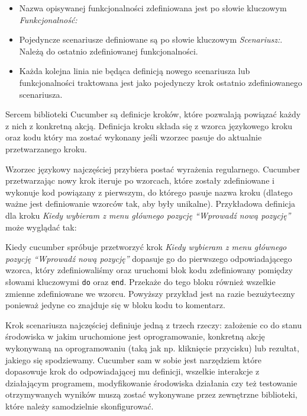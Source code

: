         \begin{itemize}
          \item Nazwa opisywanej funkcjonalności zdefiniowana jest po słowie kluczowym \emph{Funkcjonalność:}
          \item Pojedyncze scenariusze definiowane są po słowie kluczowym \emph{Scenariusz:}. Należą do ostatnio zdefiniowanej funkcjonalności.
          \item Każda kolejna linia nie będąca definicją nowego scenariusza lub funkcjonalności traktowana jest jako pojedynczy krok ostatnio zdefiniowanego scenariusza.
        \end{itemize}
        
      Sercem biblioteki Cucumber są definicje kroków, które pozwalają powiązać każdy z nich z konkretną akcją. Definicja kroku składa się z wzorca językowego kroku oraz kodu który ma zostać wykonany jeśli wzorzec pasuje do aktualnie przetwarzanego kroku.
      
      Wzorzec językowy najczęściej przybiera postać wyrażenia regularnego. Cucumber przetwarzając nowy krok iteruje po wzorcach, które zostały zdefiniowane i wykonuje kod powiązany z pierwszym, do którego pasuje nazwa kroku (dlatego ważne jest definiowanie wzorców tak, aby były unikalne). Przykładowa definicja dla kroku \emph{Kiedy wybieram z menu głównego pozycję \textquotedblleft Wprowadź nową pozycję\textquotedblright} może wyglądać tak:
      
      
      
      Kiedy cucumber spróbuje przetworzyć krok \emph{Kiedy wybieram z menu głównego pozycję \textquotedblleft Wprowadź nową pozycję\textquotedblright} dopasuje go do pierwszego odpowiadającego wzorca, który zdefiniowaliśmy oraz uruchomi blok kodu zdefiniowany pomiędzy słowami kluczowymi \verb+do+ oraz \verb+end+. Przekaże do tego bloku również wszelkie zmienne zdefiniowane we wzorcu. Powyższy przykład jest na razie bezużyteczny ponieważ jedyne co znajduje się w bloku kodu to komentarz.
      
      Krok scenariusza najczęściej definiuje jedną z trzech rzeczy: założenie co do stanu środowiska w jakim uruchomione jest oprogramowanie, konkretną akcję wykonywaną na oprogramowaniu (taką jak np. kliknięcie przycisku) lub rezultat, jakiego się spodziewamy. Cucumber sam w sobie jest narzędziem które dopasowuje krok do odpowiadającej mu definicji, wszelkie interakcje z działającym programem, modyfikowanie środowiska działania czy też testowanie otrzymywanych wyników muszą zostać wykonywane przez zewnętrzne biblioteki, które należy samodzielnie skonfigurować.
      
